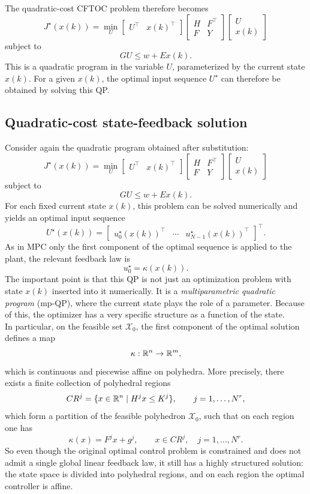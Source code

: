 The quadratic-cost CFTOC problem therefore becomes
\[
J^\star(x(k))
=
\min_U
\begin{bmatrix}
U^\top & x(k)^\top
\end{bmatrix}
\begin{bmatrix}
H & F^\top\\
F & Y
\end{bmatrix}
\begin{bmatrix}
U\\
x(k)
\end{bmatrix}
\]
subject to
\[
GU \le w + Ex(k).
\]
This is a quadratic program in the variable \(U\), parameterized by the current state \(x(k)\).
For a given \(x(k)\), the optimal input sequence \(U^\star\) can therefore be obtained by solving
this QP.

\subsection{Quadratic-cost state-feedback solution}

Consider again the quadratic program obtained after substitution:
\[
J^\star(x(k))
=
\min_U
\begin{bmatrix}
U^\top & x(k)^\top
\end{bmatrix}
\begin{bmatrix}
H & F^\top\\
F & Y
\end{bmatrix}
\begin{bmatrix}
U\\
x(k)
\end{bmatrix}
\]
subject to
\[
GU \le w + Ex(k).
\]
For each fixed current state \(x(k)\), this problem can be solved numerically and yields an
optimal input sequence
\[
U^\star(x(k))
=
\begin{bmatrix}
u_0^\star(x(k))^\top & \cdots & u_{N-1}^\star(x(k))^\top
\end{bmatrix}^\top.
\]
As in MPC only the first component of the optimal sequence is applied to the plant, the
relevant feedback law is
\[
u_0^\star=\kappa(x(k)).
\]
The important point is that this QP is not just an optimization problem with state \(x(k)\)
inserted into it numerically. It is a \emph{multiparametric quadratic program} (mp-QP), where
the current state plays the role of a parameter. Because of this, the optimizer has a very
specific structure as a function of the state.\\

In particular, on the feasible set \(\mathcal X_0\), the first component of the optimal solution
defines a map
\[
\kappa:\mathbb{R}^n\to\mathbb{R}^m,
\]
which is continuous and piecewise affine on polyhedra. More precisely, there exists a finite
collection of polyhedral regions
\[
CR^j=\{x\in\mathbb{R}^n \mid H^j x \le K^j\},\qquad j=1,\dots,N^r,
\]
which form a partition of the feasible polyhedron \(\mathcal X_0\), such that on each region one
has
\[
\kappa(x)=F^j x + g^j,\qquad x\in CR^j,\quad j=1,\dots,N^r.
\]
So even though the original optimal control problem is constrained and does not admit a single
global linear feedback law, it still has a highly structured solution: the state space is divided
into polyhedral regions, and on each region the optimal controller is affine.\\

